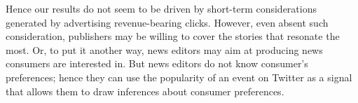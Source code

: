Hence our results do not seem to be driven by short-term considerations generated by advertising revenue-bearing clicks. However, even absent such consideration, publishers may be willing to cover the stories that resonate the most. Or, to put it another way, news editors may aim at producing news consumers are interested in. But news editors do not know consumer's preferences; hence they can use the popularity of an event on Twitter as a signal that allows them to draw inferences about consumer preferences.

%
%
%
%
